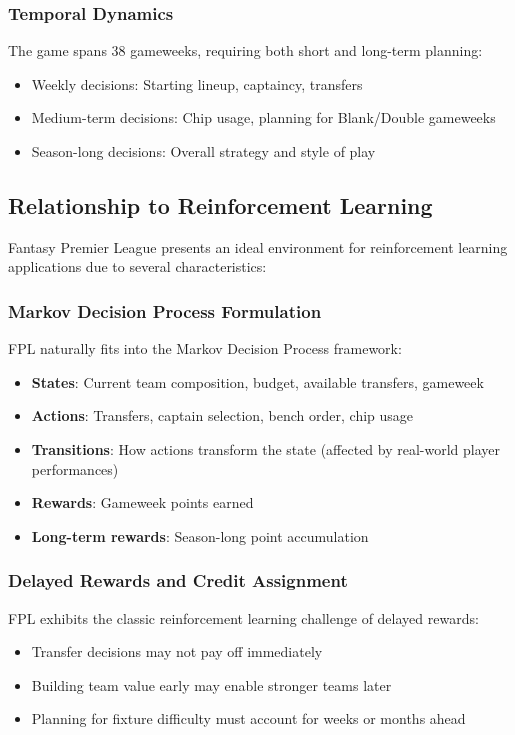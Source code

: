 \subsubsection{Temporal Dynamics}

The game spans 38 gameweeks, requiring both short and long-term planning:
\begin{itemize}
    \item Weekly decisions: Starting lineup, captaincy, transfers
    \item Medium-term decisions: Chip usage, planning for Blank/Double gameweeks
    \item Season-long decisions: Overall strategy and style of play \cite{constantinou2019}
\end{itemize}

\subsection{Relationship to Reinforcement Learning}

Fantasy Premier League presents an ideal environment for reinforcement learning applications due to several characteristics:

\subsubsection{Markov Decision Process Formulation}

FPL naturally fits into the Markov Decision Process framework:
\begin{itemize}
    \item \textbf{States}: Current team composition, budget, available transfers, gameweek
    \item \textbf{Actions}: Transfers, captain selection, bench order, chip usage
    \item \textbf{Transitions}: How actions transform the state (affected by real-world player performances)
    \item \textbf{Rewards}: Gameweek points earned
    \item \textbf{Long-term rewards}: Season-long point accumulation \cite{sutton2018, butler2021}
\end{itemize}

\subsubsection{Delayed Rewards and Credit Assignment}

FPL exhibits the classic reinforcement learning challenge of delayed rewards:
\begin{itemize}
    \item Transfer decisions may not pay off immediately
    \item Building team value early may enable stronger teams later
    \item Planning for fixture difficulty must account for weeks or months ahead \cite{silver2017}
\end{itemize}

